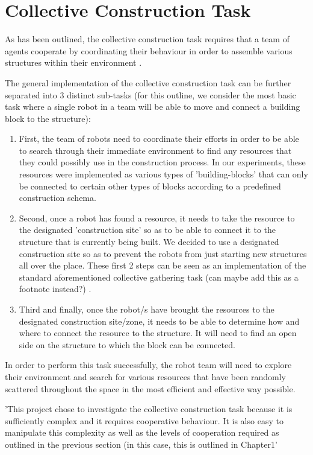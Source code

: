 \section{Collective Construction Task}

As has been outlined, the collective construction task requires that a team of agents cooperate by coordinating their behaviour in order to assemble various structures within their environment \cite{NitschkeSaEC2012}.

The general implementation of the collective construction task can be further separated into 3 distinct sub-tasks (for this outline, we consider the most basic task where a single robot in a team will be able to move and connect a building block to the structure):
\begin{enumerate}
	\item First, the team of robots need to coordinate their efforts in order to be able to search through their immediate environment to find any resources that they could possibly use in the construction process. In our experiments, these resources were implemented as various types of 'building-blocks' that can only be connected to certain other types of blocks according to a predefined construction schema.
	\item Second, once a robot has found a resource, it needs to take the resource to the designated 'construction site' so as to be able to connect it to the structure that is currently being built. We decided to use a designated construction site so as to prevent the robots from just starting new structures all over the place. These first 2 steps can be seen as an implementation of the standard aforementioned collective gathering task (can maybe add this as a footnote instead?) \cite{NitschkeSaEC2012}.
	\item Third and finally, once the robot/s have brought the resources to the designated construction site/zone, it needs to be able to determine how and where to connect the resource to the structure. It will need to find an open side on the structure to which the block can be connected.
\end{enumerate}

In order to perform this task successfully, the robot team will need to explore their environment and search for various resources that have been randomly scattered throughout the space in the most efficient and effective way possible.

'This project chose to investigate the collective construction task because it is sufficiently complex and it requires cooperative behaviour. It is also easy to manipulate this complexity as well as the levels of cooperation required as outlined in the previous section (in this case, this is outlined in Chapter1'



